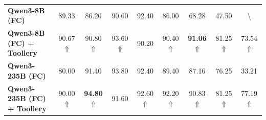 \begin{table}[htb]
{\begin{tabular}{lcccccccc}
\textbf{Qwen3-8B (FC)}                      & 89.33 & 86.20 & 90.60 & 92.40 & 86.00 & 68.28 & 47.50 & \textbackslash{} \\
\textbf{Qwen3-8B (FC) + Toollery}           & 90.67 $\Uparrow$ & 90.80 $\Uparrow$ & 93.60 $\Uparrow$ & 90.20 & 90.40 $\Uparrow$ & \textbf{91.06} $\Uparrow$ & 81.25 $\Uparrow$ & 73.54 $\Uparrow$            \\ \hline
\textbf{Qwen3-235B (FC)}                    & 80.00 & 91.40 & 93.80 & 92.40 & 89.40 & 87.16 & 76.25 & 33.21            \\
\textbf{Qwen3-235B (FC) + Toollery}         & 90.00 $\Uparrow$ & \textbf{94.80} $\Uparrow$ & 91.60 & 92.60 $\Uparrow$ & 92.20 $\Uparrow$ & 90.83 $\Uparrow$ & 81.25 $\Uparrow$ & 77.19 $\Uparrow$            \\ \hline \hline
\end{tabular}
}
\vskip -0.1in
\end{table}